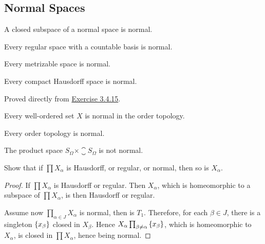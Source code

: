 \documentclass[12pt,a4paper]{article}
\begin{document}
    \subsection{Normal Spaces}
    \begin{thm}
        A closed subspace of a normal space is normal.
    \end{thm}
    \hfill
    
    \begin{thm}\label{4.3.2}
        Every regular space with a countable basis is normal.
    \end{thm}
    \hfill

    \begin{thm}\label{4.3.3}
        Every metrizable space is normal.
    \end{thm}
    \hfill

    \begin{thm}
        Every compact Hausdorff space is normal.
    \end{thm}
    \begin{remark}
        Proved directly from \hyperref[3.4.15]{Exercise 3.4.15}.
    \end{remark}
    \hfill

    \begin{thm}
        Every well-ordered set $X$ is normal in the order topology.
    \end{thm}
    \begin{thm}
        Every order topology is normal. 
    \end{thm}
    \hfill

    \begin{eg}
        The product space $S_\Omega\times\closure{S_\Omega}$ is not normal.
    \end{eg}
    \hfill

    \begin{ex}
        Show that if $\prod X_\alpha$ is Hausdorff, or regular, or normal, then so is $X_\alpha$.
    \end{ex}
    \begin{proof}
        If $\prod X_\alpha$ is Hausdorff or regular. Then $X_\alpha$, which is homeomorphic to a subspace of $\prod X_\alpha$, is then Hausdorff or regular.

        Assume now $\prod_{\alpha\in J} X_\alpha$ is normal, then is $T_1$. Therefore, for each $\beta\in J$, there is a singleton $\left\{x_\beta\right\}$ closed in $X_\beta$. Hence $X_\alpha\prod_{\beta\neq\alpha}\left\{x_\beta\right\}$, which is homeomorphic to $X_\alpha$, is closed in $\prod X_\alpha$, hence being normal.
    \end{proof}
    \hfill
\end{document}
